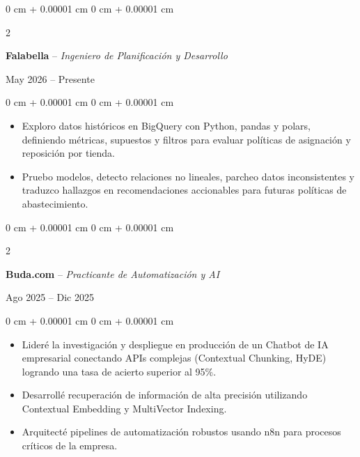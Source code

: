 \documentclass[10pt, letterpaper]{article}
\newenvironment{highlights}{
    \begin{itemize}[
        topsep=0.10 cm,
        parsep=0.10 cm,
        partopsep=0pt,
        itemsep=0pt,
        leftmargin=0 cm + 10pt
    ]
}{
    \end{itemize}
} %
\newenvironment{onecolentry}{
    \begin{adjustwidth}{
        0 cm + 0.00001 cm
    }{
        0 cm + 0.00001 cm
    }
}{
    \end{adjustwidth}
} %
\newenvironment{twocolentry}[2][]{
    \onecolentry
    \def\secondColumn{#2}
    \setcolumnwidth{\fill, 4.5 cm}
    \begin{paracol}{2}
}{
    \switchcolumn \raggedleft \secondColumn
    \end{paracol}
    \endonecolentry
} %
\begin{document}
    \begin{twocolentry}{May 2026 -- Presente}
        \textbf{Falabella} -- \textit{Ingeniero de Planificación y Desarrollo}
    \end{twocolentry}
    \vspace{0.10 cm}
    \begin{onecolentry}
        \begin{highlights}
            \item Exploro datos históricos en BigQuery con Python, pandas y polars, definiendo métricas, supuestos y filtros para evaluar políticas de asignación y reposición por tienda.
            \item Pruebo modelos, detecto relaciones no lineales, parcheo datos inconsistentes y traduzco hallazgos en recomendaciones accionables para futuras políticas de abastecimiento.
        \end{highlights}
    \end{onecolentry}
    \vspace{0.2 cm}

    \begin{twocolentry}{Ago 2025 – Dic 2025}
        \textbf{Buda.com} -- \textit{Practicante de Automatización y AI}
    \end{twocolentry}
    \vspace{0.10 cm}
    \begin{onecolentry}
        \begin{highlights}
            \item Lideré la investigación y despliegue en producción de un Chatbot de IA empresarial conectando APIs complejas (Contextual Chunking, HyDE) logrando una tasa de acierto superior al 95\%.
            \item Desarrollé recuperación de información de alta precisión utilizando Contextual Embedding y MultiVector Indexing.
            \item Arquitecté pipelines de automatización robustos usando n8n para procesos críticos de la empresa.
        \end{highlights}
    \end{onecolentry}
    \vspace{0.2 cm}
\end{document}
